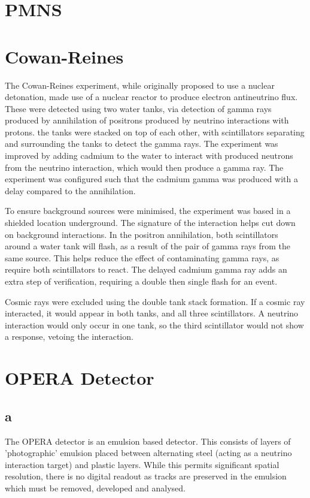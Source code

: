 \documentclass[]{article}
\begin{document}
\section{PMNS}
\newpage

\section{Cowan-Reines}

The Cowan-Reines experiment, while originally proposed to use a nuclear detonation, made use of a nuclear reactor to produce electron antineutrino flux. These were detected using two water tanks, via detection of gamma rays produced by annihilation of positrons produced by neutrino interactions with protons. the tanks were stacked on top of each other, with scintillators separating and surrounding the tanks to detect the gamma rays. The experiment was improved by adding cadmium to the water to interact with produced neutrons from the neutrino interaction, which would then produce a gamma ray. The experiment was configured such that the cadmium gamma was produced with a delay compared to the annihilation. 

To ensure background sources were minimised, the experiment was based in a shielded location underground. The signature of the interaction helps cut down on background interactions. In the positron annihilation, both scintillators around a water tank will flash, as a result of the pair of gamma rays from the same source. This helps reduce the effect of contaminating gamma rays, as require both scintillators to react. The delayed cadmium gamma ray adds an extra step of verification, requiring a double then single flash for an event.

Cosmic rays were excluded using the double tank stack formation. If a cosmic ray interacted, it would appear in both tanks, and all three scintillators. A neutrino interaction would only occur in one tank, so the third scintillator would not show a response, vetoing the interaction. 

\section{OPERA Detector}

	\subsection{a}

		The OPERA detector is an emulsion based detector. This consists of layers of 'photographic' emulsion placed between alternating steel (acting as a neutrino interaction target) and plastic layers. While this permits significant spatial resolution, there is no digital readout as tracks are preserved in the emulsion which must be removed, developed and analysed.
		
\end{document}
